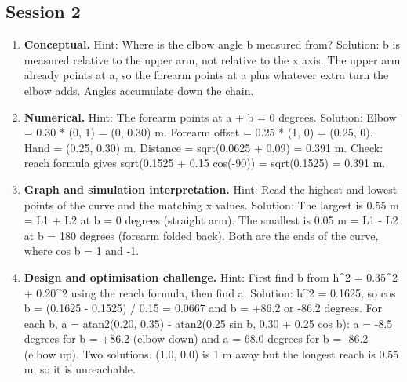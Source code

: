 \documentclass[11pt,a4paper]{article}
\begin{document}
\subsection*{Session 2}
\begin{enumerate}[nosep]
\item \textbf{Conceptual.} Hint: Where is the elbow angle b measured from? Solution: b is measured relative to the upper arm, not relative to the x axis. The upper arm already points at a, so the forearm points at a plus whatever extra turn the elbow adds. Angles accumulate down the chain.
\item \textbf{Numerical.} Hint: The forearm points at a + b = 0 degrees. Solution: Elbow = 0.30 * (0, 1) = (0, 0.30) m. Forearm offset = 0.25 * (1, 0) = (0.25, 0). Hand = (0.25, 0.30) m. Distance = sqrt(0.0625 + 0.09) = 0.391 m. Check: reach formula gives sqrt(0.1525 + 0.15 cos(-90)) = sqrt(0.1525) = 0.391 m.
\item \textbf{Graph and simulation interpretation.} Hint: Read the highest and lowest points of the curve and the matching x values. Solution: The largest is 0.55 m = L1 + L2 at b = 0 degrees (straight arm). The smallest is 0.05 m = \textbar{}L1 - L2\textbar{} at b = 180 degrees (forearm folded back). Both are the ends of the curve, where cos b = 1 and -1.
\item \textbf{Design and optimisation challenge.} Hint: First find b from \textbar{}h\textbar{}\textasciicircum{}2 = 0.35\textasciicircum{}2 + 0.20\textasciicircum{}2 using the reach formula, then find a. Solution: \textbar{}h\textbar{}\textasciicircum{}2 = 0.1625, so cos b = (0.1625 - 0.1525) / 0.15 = 0.0667 and b = +86.2 or -86.2 degrees. For each b, a = atan2(0.20, 0.35) - atan2(0.25 sin b, 0.30 + 0.25 cos b): a = -8.5 degrees for b = +86.2 (elbow down) and a = 68.0 degrees for b = -86.2 (elbow up). Two solutions. (1.0, 0.0) is 1 m away but the longest reach is 0.55 m, so it is unreachable.
\end{enumerate}
\end{document}
